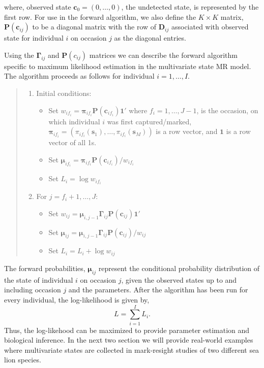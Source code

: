 \documentclass[sts]{imsart}
\numberwithin{equation}{section}
\theoremstyle{plain}
\newcommand{\bs}{\ensuremath{\mathbf{s}}}
\newcommand{\bc}{\ensuremath{\mathbf{c}}}
\newcommand{\bG}{\ensuremath{\boldsymbol{\Gamma}}}
\newcommand{\bD}{\ensuremath{\mathbf{D}}}
\newcommand{\bP}{\ensuremath{\mathbf{P}}}
\begin{document}
where, observed state $\bc_0 = (0,\dots,0)$, the undetected state, is represented by the first row.
For use in the forward algorithm, we also define the $K\times K$ matrix, $\bP(\bc_{ij})$ to be a diagonal matrix with the row of $\bD_{ij}$ associated with observed state for individual $i$ on occasion $j$ as the diagonal entries.

Using the $\bG_{ij}$ and $\bP(c_{ij})$ matrices we can describe the forward algorithm specific to maximum likelihood estimation in the multivariate state MR model. The algorithm proceeds as follows for individual $i=1,\dots,I$.
\begin{quote}
\begin{enumerate}
\item Initial conditions:
\begin{itemize}
\item Set $w_{if_i} = \boldsymbol{\pi}_{if_i}\bP(\bc_{if_i})\mathbf{1}'$ where $f_i=1,\dots,J-1$, is the occasion, on which individual $i$ was first captured/marked, $\boldsymbol{\pi}_{if_i} = (\pi_{if_i}(\bs_1),\dots,\pi_{if_i}(\bs_M))$ is a row vector, and $\mathbf{1}$ is a row vector of all 1s.
\item Set $\boldsymbol{\mu}_{if_i} = \boldsymbol{\pi}_{if_i}\bP(\bc_{if_i})/w_{if_i}$
\item Set $L_{i} = \log w_{if_i}$
\end{itemize}
\item For $j=f_i+1,\dots,J$:
\begin{itemize}
\item Set $w_{ij} = \boldsymbol{\mu}_{i,j-1}\bG_{ij}\bP(\bc_{ij})\mathbf{1}'$
\item Set $\boldsymbol{\mu}_{ij} = \boldsymbol{\mu}_{i,j-1}\bG_{ij}\bP(\bc_{ij})/w_{ij}$
\item Set $L_i = L_i + \log w_{ij}$
\end{itemize}
\end{enumerate}
\end{quote}
The forward probabilities, $\boldsymbol{\mu}_{ij}$ represent the conditional probability distribution of the state of individual $i$ on occasion $j$, given the observed states up to and including occasion $j$ and the parameters. After the algorithm has been run for every individual, the log-likelihood is given by,
\begin{equation}
L = \sum_{i=1}^I L_i.
\end{equation}
Thus, the log-likehood can be maximized to provide parameter estimation and biological inference. In the next two section we will provide real-world examples where multivariate states are collected in mark-resight studies of two different sea lion species.  
\end{document}
